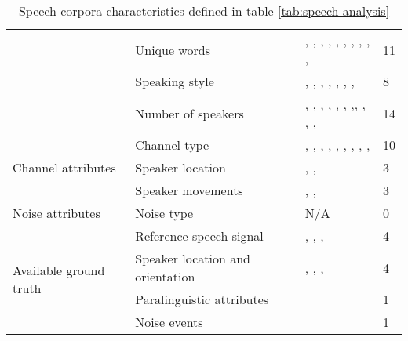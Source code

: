 \documentclass[conference]{IEEEtran}
\begin{document}
\begin{table*}[h]
\begin{tabular}{|l|l|l|l|}
    & Unique words & 
    \cite{bougrine2017altruistic}, \cite{bougrine2017altruistic}, \cite{ng2017shefce}, \cite{moore2017sheffield}, \cite{ramli2017first}, \cite{goldman2016siwis}, \cite{liu2016sheffield}, \cite{ruilan2016improving}, \cite{klessa2013paralingua}, \cite{nagino2008building}, \cite{clopper2006nationwide} & 11
    \\ \cline{2-4} & Speaking style &
    \cite{dwivedi2017documenting}, \cite{bougrine2017altruistic}, \cite{ng2017shefce}, \cite{moore2017sheffield}, \cite{ramli2017first}, \cite{goldman2016siwis}, \cite{nagino2008building}, \cite{clopper2006nationwide} & 8
    \\ \cline{2-4} & Number of speakers & 
    \cite{dwivedi2017documenting}, \cite{bougrine2017altruistic}, \cite{bougrine2017altruistic}, \cite{ng2017shefce}, \cite{moore2017sheffield}, \cite{ramli2017first}, \cite{goldman2016siwis},, \cite{ruilan2016improving} \cite{liu2016sheffield}, \cite{klessa2013paralingua}, \cite{nagino2008building}, \cite{clopper2006nationwide} & 14
\\ \hline \multirow{3}{*}{Channel attributes}
    & Channel type & 
    \cite{dwivedi2017documenting}, \cite{bougrine2017altruistic}, \cite{ng2017shefce}, \cite{moore2017sheffield}, \cite{ramli2017first}, \cite{goldman2016siwis}, \cite{liu2016sheffield}, \cite{ruilan2016improving}, \cite{nagino2008building}, \cite{clopper2006nationwide} & 10
    \\ \cline{2-4} & Speaker location & 
    \cite{dwivedi2017documenting}, \cite{ng2017shefce}, \cite{liu2016sheffield} & 3
    \\ \cline{2-4} & Speaker movements & 
    \cite{dwivedi2017documenting}, \cite{moore2017sheffield}, \cite{liu2016sheffield} & 3
\\ \hline \multirow{1}{*}{Noise attributes}
    & Noise type & N/A &
    0
\\ \hline \multirow{4}{*}{Available ground truth} 
    & Reference speech signal & 
    \cite{ng2017shefce}, \cite{moore2017sheffield}, \cite{ramli2017first}, \cite{liu2016sheffield} & 4
    \\ \cline{2-4} & Speaker location and orientation &
    \cite{bougrine2017altruistic}, \cite{moore2017sheffield}, \cite{ramli2017first}, \cite{liu2016sheffield} & 4
    \\ \cline{2-4} & Paralinguistic attributes &
    \cite{klessa2013paralingua} & 1
    \\ \cline{2-4} & Noise events & 
    \cite{ramli2017first} & 1
    \\ \hline
\end{tabular}
\caption{Speech corpora characteristics defined in table \ref{tab:speech-analysis}}
\label{tab:results-attributes}
\end{table*}
\end{document}
